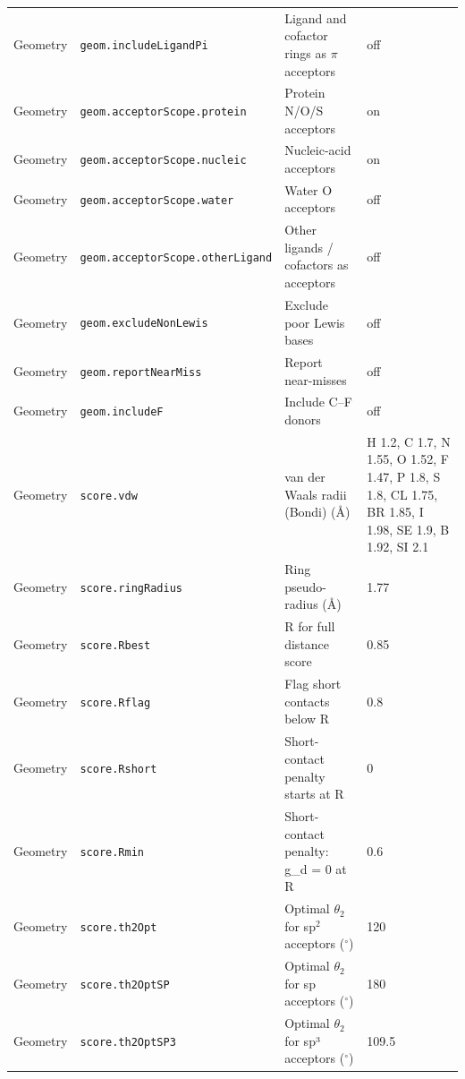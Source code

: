 \documentclass[journal=jcisd8,manuscript=suppinfo]{achemso}
\begin{document}
\begin{singlespace}
{\begin{longtable}{llp{4.2cm}l}
Geometry & \texttt{geom.includeLigandPi} & Ligand and cofactor rings as $\pi$ acceptors & \parbox[t]{5.0cm}{\raggedright off}\\
Geometry & \texttt{geom.acceptorScope.protein} & Protein N/O/S acceptors & \parbox[t]{5.0cm}{\raggedright on}\\
Geometry & \texttt{geom.acceptorScope.nucleic} & Nucleic-acid acceptors & \parbox[t]{5.0cm}{\raggedright on}\\
Geometry & \texttt{geom.acceptorScope.water} & Water O acceptors & \parbox[t]{5.0cm}{\raggedright off}\\
Geometry & \texttt{geom.acceptorScope.otherLigand} & Other ligands / cofactors as acceptors & \parbox[t]{5.0cm}{\raggedright off}\\
Geometry & \texttt{geom.excludeNonLewis} & Exclude poor Lewis bases & \parbox[t]{5.0cm}{\raggedright off}\\
Geometry & \texttt{geom.reportNearMiss} & Report near-misses & \parbox[t]{5.0cm}{\raggedright off}\\
Geometry & \texttt{geom.includeF} & Include C--F donors & \parbox[t]{5.0cm}{\raggedright off}\\
Geometry & \texttt{score.vdw} & van der Waals radii (Bondi) (\AA{}) & \parbox[t]{5.0cm}{\raggedright H 1.2, C 1.7, N 1.55, O 1.52, F 1.47, P 1.8, S 1.8, CL 1.75, BR 1.85, I 1.98, SE 1.9, B 1.92, SI 2.1}\\
Geometry & \texttt{score.ringRadius} & Ring pseudo-radius (\AA{}) & \parbox[t]{5.0cm}{\raggedright 1.77}\\
Geometry & \texttt{score.Rbest} & R for full distance score & \parbox[t]{5.0cm}{\raggedright 0.85}\\
Geometry & \texttt{score.Rflag} & Flag short contacts below R & \parbox[t]{5.0cm}{\raggedright 0.8}\\
Geometry & \texttt{score.Rshort} & Short-contact penalty starts at R & \parbox[t]{5.0cm}{\raggedright 0}\\
Geometry & \texttt{score.Rmin} & Short-contact penalty: g\_d = 0 at R & \parbox[t]{5.0cm}{\raggedright 0.6}\\
Geometry & \texttt{score.th2Opt} & Optimal $\theta_2$ for sp$^2$ acceptors ($^\circ$) & \parbox[t]{5.0cm}{\raggedright 120}\\
Geometry & \texttt{score.th2OptSP} & Optimal $\theta_2$ for sp acceptors ($^\circ$) & \parbox[t]{5.0cm}{\raggedright 180}\\
Geometry & \texttt{score.th2OptSP3} & Optimal $\theta_2$ for sp³ acceptors ($^\circ$) & \parbox[t]{5.0cm}{\raggedright 109.5}\\

\end{longtable}}
\end{singlespace}
\end{document}
